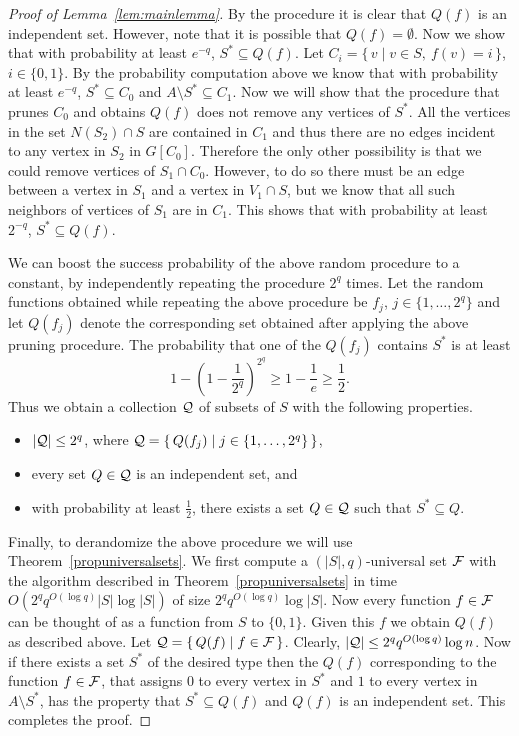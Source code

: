 \documentclass[10pt,usletter]{article}
\newcommand{\SB}{\{\,}\newcommand{\SM}{\;{|}\;}\newcommand{\SE}{\,\}}
\begin{document}
\begin{proof}[Proof of Lemma~\ref{lem:mainlemma}]
By the procedure it is clear that $Q(f)$ is an independent set. However, note that it is possible that $Q(f)=\emptyset$. 
Now we show that with probability at least $e^{-q}$, $S^*\subseteq
Q(f)$. Let $C_i=\SB v \SM v\in S,~f(v)=i\SE$, $i\in \{0,1\}$.
By the probability computation above we know that with probability at least $e^{-q}$, $S^*\subseteq C_0$ and 
$A\setminus S^* \subseteq C_1$. Now we will show that the procedure that prunes $C_0$ and obtains $Q(f)$ does not remove 
any vertices of $S^*$. All the vertices in the set $N(S_2)\cap S$ are contained in $C_1$  and thus there are no edges incident 
to any vertex in $S_2$ in $G[C_0]$. Therefore the only other possibility is that we could remove vertices of 
$S_1\cap C_0$. However, to do so there must be an edge between a vertex in $S_1$ and a vertex in $V_1\cap S$, 
but we know that 
all such neighbors of vertices of $S_1$ are in $C_1$. This shows that with probability at least $2^{-q}$, 
$S^*\subseteq Q(f)$. 



We can boost the success probability of the above random procedure to a constant, by independently repeating the  procedure 
$2^q$ times. Let the random functions obtained while repeating the above procedure 
be $f_{j}$, $j\in \{1,\ldots,2^q\}$ and let $Q(f_j)$ denote the corresponding set obtained after applying the above pruning 
procedure. The probability that  one of the $Q(f_j)$ contains $S^{*}$ is at least 
\[1-\left(1-\frac{1}{2^q}\right)^{2^q} \geq 1-\frac{1}{e}\geq \frac{1}{2}.\]
Thus we obtain a collection $\cal Q$ of subsets of $S$ with the following properties. 
\begin{itemize}
 \item $|{\cal Q}| \leq 2^q$, where ${\cal Q}=\SB Q(f_j) \SM j\in\{1,\ldots,2^q\}\SE$,
\item  every set $Q\in \cal Q$ is an independent set, and 
\item  with probability at least $\frac{1}{2}$, there exists a set $Q\in \cal Q$ such that $S^*\subseteq Q$. 
\end{itemize}

Finally, to derandomize the above procedure we will use Theorem~\ref{propuniversalsets}. We first 
compute a $(|S|,q)$-universal set $\cal F$ with the algorithm described in Theorem~\ref{propuniversalsets} in time 
$O(2^q q^{O(\log q)} |S|\log |S|)$ of size $2^q q^{O(\log q)}\log |S|$. Now every function $f\in {\cal F}$ can be thought of 
as a function from $S$ to $\{0,1\}$. Given this $f$ we obtain $Q(f)$ as described above. Let 
${\cal Q}=\SB Q(f) \SM f\in {\cal F}\SE$. Clearly, $|{\cal Q}|\leq 2^q q^{O(\log q)}\log n$. Now if there exists a set 
$S^*$ of the desired type then the $Q(f)$ corresponding to the function $f\in {\cal F}$, that assigns $0$ to 
every vertex in $S^*$ and $1$ to every vertex in $A\setminus S^*$, has the property that $S^*\subseteq Q(f)$ and $Q(f)$ is an independent set.  
This completes the proof. 
\end{proof}
\end{document}
